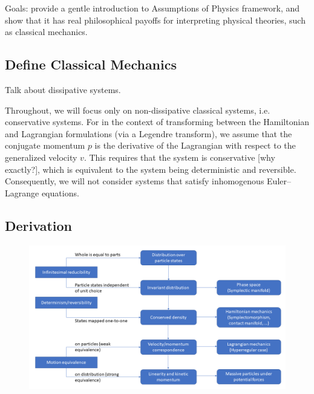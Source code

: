 \documentclass[letterpaper]{article}
\begin{document}
Goals: provide a gentle introduction to Assumptions of Physics framework, and show that it has real philosophical payoffs for interpreting physical theories, such as classical mechanics.



\subsection{Define Classical Mechanics}

Talk about dissipative systems.

Throughout, we will focus only on non-dissipative classical systems, i.e. conservative systems. For in the context of transforming between the Hamiltonian and Lagrangian formulations (via a Legendre transform), we assume that the conjugate momentum $p$ is the derivative of the Lagrangian with respect to the generalized velocity $v $. This requires that the system is conservative [why exactly?], which is equivalent to the system being deterministic and reversible. Consequently, we will not consider systems that satisfy inhomogenous Euler--Lagrange equations.

\subsection{Derivation}

\begin{figure}[h]
	\centering
	\includegraphics[width=\textwidth]{Diagram.png}
\end{figure}
\end{document}
